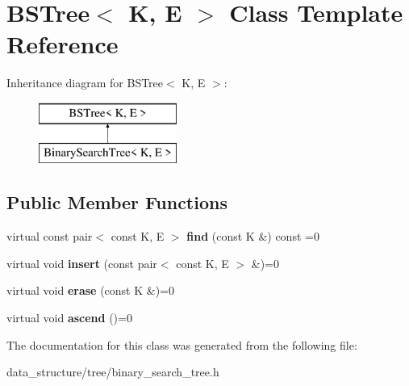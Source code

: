 \hypertarget{classBSTree}{}\section{B\+S\+Tree$<$ K, E $>$ Class Template Reference}
\label{classBSTree}
Inheritance diagram for B\+S\+Tree$<$ K, E $>$\+:\begin{figure}[H]
\begin{center}
\leavevmode
\includegraphics[height=2.000000cm]{classBSTree}
\end{center}
\end{figure}
\subsection*{Public Member Functions}
\begin{DoxyCompactItemize}
\item 
\mbox{\label{classBSTree_aef2c4b7362084b3aa5c10175f0d120ca}} 
virtual const pair$<$ const K, E $>$ {\bfseries find} (const K \&) const =0
\item 
\mbox{\label{classBSTree_aa504fb22644d5f492adeb0a75c5c34ad}} 
virtual void {\bfseries insert} (const pair$<$ const K, E $>$ \&)=0
\item 
\mbox{\label{classBSTree_a875bb53c8b086d7d61d9b65eb89ed6d1}} 
virtual void {\bfseries erase} (const K \&)=0
\item 
\mbox{\label{classBSTree_a04ddff6640edd09c9b394d409157c225}} 
virtual void {\bfseries ascend} ()=0
\end{DoxyCompactItemize}


The documentation for this class was generated from the following file\+:\begin{DoxyCompactItemize}
\item 
data\+\_\+structure/tree/binary\+\_\+search\+\_\+tree.\+h\end{DoxyCompactItemize}
